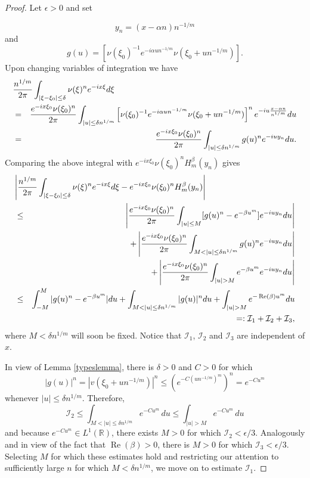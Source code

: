 \documentclass{article}
\theoremstyle{theorem}
\theoremstyle{remark}
\renewcommand\Re{\operatorname{Re}}%
\begin{document}
\begin{proof}
Let $\epsilon>0$ and set

\begin{equation*}
 y_n=(x-\alpha n)n^{-1/m}
\end{equation*}
and
\begin{equation*}
 g(u)=\left[\nu(\xi_0)^{-1} e^{-i\alpha u n^{-1/m}}\nu(\xi_0+u
n^{-1/m})\right]. 
\end{equation*}
Upon changing variables of integration we have
\begin{eqnarray*}
\lefteqn{\frac{n^{1/m}}{2\pi}\int_{|\xi-\xi_0|\leq\delta}\nu(\xi)^n e^{-ix\xi}d\xi}\\
&=&\frac{e^{-ix\xi_0}\nu(\xi_0)^n}{2\pi }\int_{|u|\leq\delta
n^{1/m}}\left[\nu(\xi_0)^{-1}e^{-i\alpha u n^{-1/m}}\nu(\xi_0+u
n^{-1/m})\right]^n e^{-iu\frac{x-\alpha n}{n^{1/m}}}du\\
&=&\frac{e^{-ix\xi_0}\nu(\xi_0)^n}{2\pi}\int_{|u|\leq\delta
n^{1/m}}g(u)^ne^{-iuy_n}du.
\end{eqnarray*}
Comparing the above integral with $e^{-ix\xi_0}\nu(\xi_0)^n H_{m}^{\beta}(y_n)$
gives
\begin{eqnarray*}
 \lefteqn{\left|\frac{n^{1/m}}{2\pi}\int_{|\xi-\xi_0|\leq\delta}\nu(\xi)^n e^{-ix\xi}d\xi-e^{-ix\xi_0}\nu(\xi_0)^n H_{m}^{\beta}(y_n)\right|}\\
&\leq&\left|\frac{e^{-ix\xi_0}\nu(\xi_0)^n}{2\pi }\int_{|u|\leq M}[g(u)^n-e^{-\beta u^m}]e^{-iuy_n}du\right|\\
&&+\left|\frac{e^{-ix\xi_0}\nu(\xi_0)^n}{2\pi }\int_{M<|u|\leq\delta
n^{1/m}}g(u)^ne^{-iuy_n}du\right|\\
&&+\left|\frac{e^{-ix\xi_0}\nu(\xi_0)^n}{2\pi }\int_{|u|>M}e^{-\beta
u^m}e^{-iuy_n}du\right|\\
&\leq&\int_{-M}^M|g(u)^n-e^{-\beta
u^m}|du+\int_{M<|u|\leq \delta n^{1/m}}|g(u)|^n du+\int_{|u|>M}e^{-\Re(\beta) u^m}du\\
&&=:\mathcal{I}_1+\mathcal{I}_2+\mathcal{I}_3,
\end{eqnarray*}
where $M<\delta n^{1/m}$ will soon be fixed. Notice that $\mathcal{I}_1$, $\mathcal{I}_2$ and $\mathcal{I}_3$ are independent of $x$.

In view of Lemma \ref{typeslemma}, there is $\delta>0$ and $C>0$ for which
\begin{equation}\label{easylemmaeq1}
|g(u)|^n=|v(\xi_0+un^{-1/m})|^n\leq (e^{-C(un^{-1/m})^m})^n=e^{-Cu^m}
\end{equation}
whenever $|u|\leq\delta n^{1/m}$. Therefore, 
\begin{equation*}
\mathcal{I}_2\leq \int_{M<|u|\leq\delta n^{1/m}}e^{-Cu^m}\,du\leq\int_{|u|>M}e^{-Cu^m}\,du
\end{equation*}
and because $e^{-Cu^m}\in L^1(\mathbb{R})$, there exists $M>0$ for which $\mathcal{I}_2<\epsilon/3$. 
Analogously and in view of the fact that $\Re(\beta)>0$, there is $M>0$ for which $\mathcal{I}_3<\epsilon/3$. Selecting $M$ for which these estimates hold and restricting our attention to sufficiently large $n$ for which $M<\delta n^{1/m}$, we move on to estimate $\mathcal{I}_1$.  


\end{proof}
\end{document}
